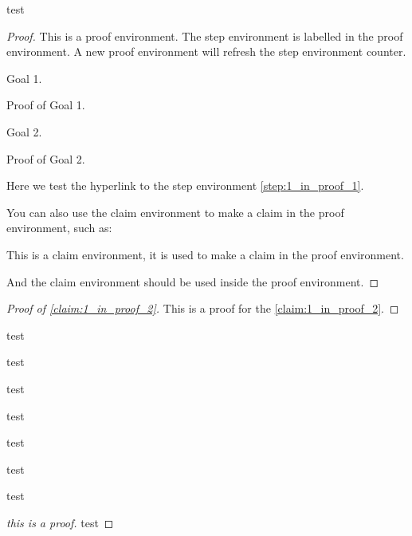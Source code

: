     \begin{theorem}
        test 
    \end{theorem}
    \begin{proof}
        This is a proof environment.
        The step environment is labelled in the proof environment.
        A new proof environment will refresh the step environment counter.
        \begin{step}\label{step:1_in_proof_2}
            Goal 1.
        \end{step}
        \begin{subproof}
            Proof of Goal 1.
        \end{subproof}
        
        \begin{step}\label{step:2_in_proof_2}
            Goal 2.
        \end{step}
        \begin{subproof}
            Proof of Goal 2.
        \end{subproof}

        Here we test the hyperlink to the step environment \cref{step:1_in_proof_1}.

        You can also use the claim environment to make a claim in the proof environment, such as:
        \begin{claim}\label{claim:1_in_proof_2}
            This is a claim environment, it is used to make a claim in the proof environment.
        \end{claim}
        And the claim environment should be used inside the proof environment.
    \end{proof}
    \begin{proof}[Proof of \cref{claim:1_in_proof_2}]
        This is a proof for the \cref{claim:1_in_proof_2}.
    \end{proof}

    \begin{lemma}
        test
    \end{lemma}
    \begin{corollary}
        test 
    \end{corollary}
    \begin{question}
        test
    \end{question}
    \begin{conjecture}
        test
    \end{conjecture}

    \begin{example}
        test 
    \end{example}
    \begin{exercise}
        test
    \end{exercise}
    \begin{remark}
        test
    \end{remark}
    \begin{proof}[this is a proof]
        test
    \end{proof}


